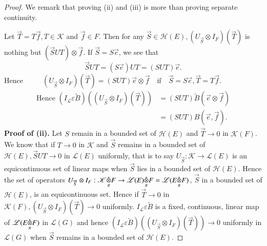 \begin{proof}
We remark that proving (ii) and (iii) is more than proving separate
continuity.

 Let $\overrightarrow{T} = T \overrightarrow{f}, T
\in \mathscr{K}$ and $\overrightarrow{f} \in F$. Then for any
$\overrightarrow{S} \in \mathscr{H}(E), (U_{\overrightarrow{S}}
\otimes I_F) (\overrightarrow{T})$ is nothing but $(\overrightarrow{S}
U T) \otimes \overrightarrow{f}$. If $\overrightarrow{S} = S
\overrightarrow{e}$, we see that 
$$
\overrightarrow{S} U T = (S \overrightarrow{e}) U T = (S U T)
\overrightarrow{e}.
$$
Hence $\hspace{1cm} (U_{\overrightarrow{S}}\otimes I_F)
(\overrightarrow{T}) = (S U T) \overrightarrow{e} \otimes
\overrightarrow{f}\quad \text{if}\quad \overrightarrow{S} = S \overrightarrow{e},
\overrightarrow{T} = T \overrightarrow{f}. \hspace{1cm}$
\begin{align*}
\text{Hence } (I_{\mathscr{L}} \varepsilon \tilde{B})
((U_{\overrightarrow{S}} \otimes I_F) (\overrightarrow{T})) &= (S U T)
\tilde{B} (\overrightarrow{e} \otimes \overrightarrow{f})\\
&= (S U T) B(\overrightarrow{e}, \overrightarrow{f}). 
\end{align*}
{\bf Proof of (ii).} Let $S$ remain in a bounded set of
$\mathscr{H}(E)$ and $\overrightarrow{T} \to 0$ in
$\mathscr{K}(F)$. We know that if $T \to 0$ in $\mathscr{K}$ and
$\overrightarrow{S}$ remains in a bounded set of $\mathscr{H}(E),
\overrightarrow{S} U T \to 0$ in $\mathscr{L}(E)$ uniformly, that is
to say $U_{\overrightarrow{S}}: \mathscr{K} \to \mathscr{L}(E)$ is an
equicontinuous set of linear maps when $\overrightarrow{S}$ lies in a
bounded set of $\mathscr{H}(E)$. Hence the set of operators
$U_{\overrightarrow{S}} \otimes I_F :\fohprod{\mathscr{K}}{F}{\pi} 
\to \mathscr{L}\fohprod{(E)}{F}{\pi}=
\mathscr{L}(\fohprod{E}{F}{\pi})$, $\overrightarrow{S}$ in a bounded
set of $\mathscr{H}(E)$, is an equicontinuous set. Hence if
$\overrightarrow{T} \to 0$ in $\mathscr{K}(F),
(U_{\overrightarrow{S}}\otimes I_F) (\overrightarrow{T}) \to 0$
uniformly. $I_{\mathscr{L}} \varepsilon \tilde{B}$ is a fixed,
continuous, linear map of $\mathscr{L}(\fohprod{E}{F}{\pi})$ 
in $\mathscr{L}(G)$ and hence $(I_{\mathscr{L}} \varepsilon
\tilde{B})((U_{\overrightarrow{S}} \otimes I_F) (\overrightarrow{T}))
\to 0$ uniformly in $\mathscr{L}(G)$ when $\overrightarrow{S}$ remains
in a bounded set of $\mathscr{H}(E)$.


\end{proof}
